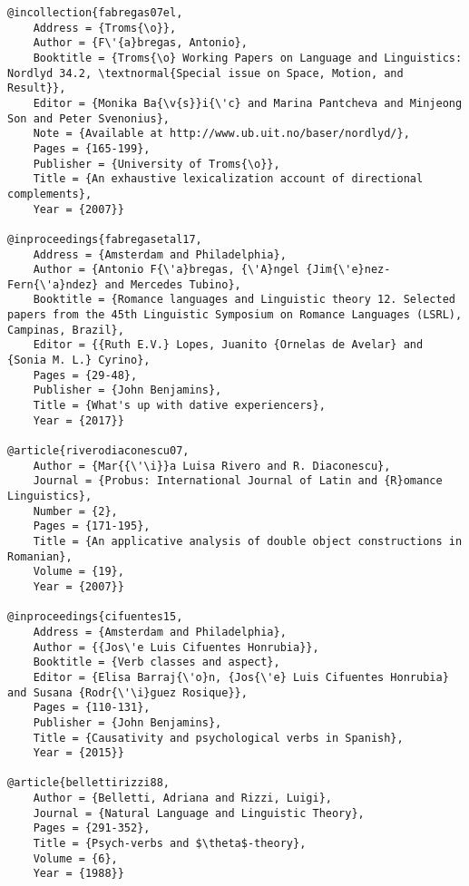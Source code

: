 \documentclass[output=paper,modfonts,nonflat]{langsci/langscibook}
\begin{document}
\begin{verbatim}
@incollection{fabregas07el,
	Address = {Troms{\o}},
	Author = {F\'{a}bregas, Antonio},
	Booktitle = {Troms{\o} Working Papers on Language and Linguistics: Nordlyd 34.2, \textnormal{Special issue on Space, Motion, and Result}},
	Editor = {Monika Ba{\v{s}}i{\'c} and Marina Pantcheva and Minjeong Son and Peter Svenonius},
	Note = {Available at http://www.ub.uit.no/baser/nordlyd/},
	Pages = {165-199},
	Publisher = {University of Troms{\o}},
	Title = {An exhaustive lexicalization account of directional complements},
	Year = {2007}}

@inproceedings{fabregasetal17,
	Address = {Amsterdam and Philadelphia},
	Author = {Antonio F{\'a}bregas, {\'A}ngel {Jim{\'e}nez-Fern{\'a}ndez} and Mercedes Tubino},
	Booktitle = {Romance languages and Linguistic theory 12. Selected papers from the 45th Linguistic Symposium on Romance Languages (LSRL), Campinas, Brazil},
	Editor = {{Ruth E.V.} Lopes, Juanito {Ornelas de Avelar} and {Sonia M. L.} Cyrino},
	Pages = {29-48},
	Publisher = {John Benjamins},
	Title = {What's up with dative experiencers},
	Year = {2017}}

@article{riverodiaconescu07,
	Author = {Mar{{\'\i}}a Luisa Rivero and R. Diaconescu},
	Journal = {Probus: International Journal of Latin and {R}omance Linguistics},
	Number = {2},
	Pages = {171-195},
	Title = {An applicative analysis of double object constructions in Romanian},
	Volume = {19},
	Year = {2007}}

@inproceedings{cifuentes15,
	Address = {Amsterdam and Philadelphia},
	Author = {{Jos\'e Luis Cifuentes Honrubia}},
	Booktitle = {Verb classes and aspect},
	Editor = {Elisa Barraj{\'o}n, {Jos{\'e} Luis Cifuentes Honrubia} and Susana {Rodr{\'\i}guez Rosique}},
	Pages = {110-131},
	Publisher = {John Benjamins},
	Title = {Causativity and psychological verbs in Spanish},
	Year = {2015}}

@article{bellettirizzi88,
	Author = {Belletti, Adriana and Rizzi, Luigi},
	Journal = {Natural Language and Linguistic Theory},
	Pages = {291-352},
	Title = {Psych-verbs and $\theta$-theory},
	Volume = {6},
	Year = {1988}}

\end{verbatim}
\sloppy\printbibliography[heading=subbibliography,notkeyword=this]
\end{document}
